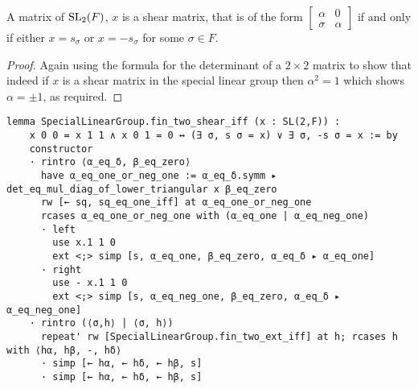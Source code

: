 \begin{corollary}
    \label{SpecialLinearGroup.fin_two_shear_iff}
    \leanok
    A matrix of $\operatorname{SL}_2(F)$, $x$ is a shear matrix, that is of the form $\begin{bmatrix}
        \alpha & 0\\
        \sigma & \alpha
    \end{bmatrix}$ if and only if either $x = s_\sigma$ or $x = - s_\sigma$ for some $\sigma \in F$.
\end{corollary}
\begin{proof}
\leanok
Again using the formula for the determinant of a $2 \times 2$ matrix to show that indeed if $x$ is a shear matrix in the special linear group 
then $\alpha^2 = 1$ which shows $\alpha = \pm 1$, as required.
\end{proof}
\begin{footnotesize}
\begin{verbatim}
lemma SpecialLinearGroup.fin_two_shear_iff (x : SL(2,F)) :
    x 0 0 = x 1 1 ∧ x 0 1 = 0 ↔ (∃ σ, s σ = x) ∨ ∃ σ, -s σ = x := by
    constructor
    · rintro ⟨α_eq_δ, β_eq_zero⟩
      have α_eq_one_or_neg_one := α_eq_δ.symm ▸ det_eq_mul_diag_of_lower_triangular x β_eq_zero
      rw [← sq, sq_eq_one_iff] at α_eq_one_or_neg_one
      rcases α_eq_one_or_neg_one with (α_eq_one | α_eq_neg_one)
      · left
        use x.1 1 0
        ext <;> simp [s, α_eq_one, β_eq_zero, α_eq_δ ▸ α_eq_one]
      · right
        use - x.1 1 0
        ext <;> simp [s, α_eq_neg_one, β_eq_zero, α_eq_δ ▸ α_eq_neg_one]
    · rintro (⟨σ,h⟩ | ⟨σ, h⟩)
      repeat' rw [SpecialLinearGroup.fin_two_ext_iff] at h; rcases h with ⟨hα, hβ, -, hδ⟩
      · simp [← hα, ← hδ, ← hβ, s]
      · simp [← hα, ← hδ, ← hβ, s]
\end{verbatim}
\end{footnotesize}

